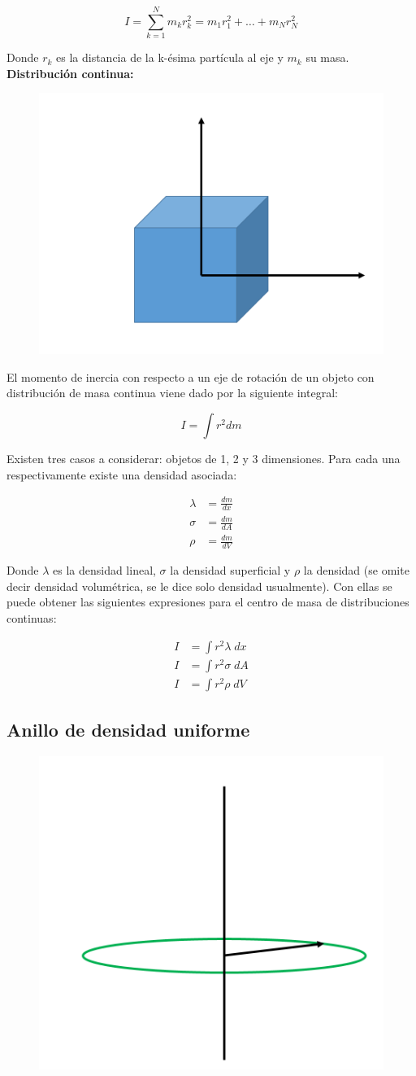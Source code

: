 \documentclass[a4paper,11pt]{article}
\theoremstyle{mytheor}
\begin{document}
$$ I = \sum_{k=1}^{N} m_k r_k^2 = m_1 r_1^2 + \dots + m_N r_N^2$$


Donde $ r_k$ es la distancia de la k-ésima partícula al eje y $m_k$ su masa. \\

\textbf{Distribución continua:}

\begin{figure}[h]
	\includegraphics[width=0.4\linewidth]{3d}
	\label{fcN4}
\end{figure}

El momento de inercia con respecto a un eje de rotación de un objeto con distribución de masa continua viene dado por la siguiente integral:

$$  I=  \int r^2 dm $$

Existen tres casos a considerar: objetos de 1, 2 y 3 dimensiones. Para cada una respectivamente existe una densidad asociada:

\begin{align*}
\lambda &= \frac{d m}{dx} \\
\sigma &= \frac{d m}{dA} \\
\rho &= \frac{d m}{dV} 
\end{align*}

Donde $\lambda$ es la densidad lineal, $\sigma$ la densidad superficial y $\rho$ la densidad (se omite decir densidad volumétrica, se le dice solo densidad usualmente). Con ellas se puede obtener las siguientes expresiones para el centro de masa de distribuciones continuas:

\begin{align*}
I &=  \int r^2 \lambda \;dx  \\
I &=  \int r^2 \sigma \;dA \\
I &=  \int r^2 \rho\; dV 
\end{align*}


\subsection{Anillo de densidad uniforme}

\begin{figure}[hh]
	\includegraphics[width=0.4\linewidth]{anillo1}
	\label{fcN4}
\end{figure}
\end{document}
